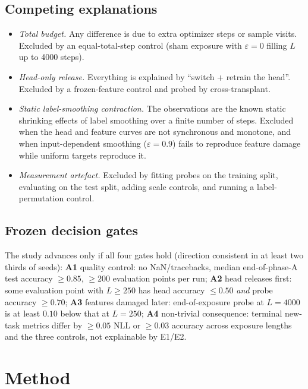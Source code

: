\documentclass[review,12pt]{elsarticle}
\begin{document}
\subsection{Competing explanations}
\label{sec:competing}
\begin{itemize}
  \item[\textbf{E1}] \emph{Total budget.} Any difference is due to extra
  optimizer steps or sample visits. Excluded by an equal-total-step control
  (sham exposure with $\varepsilon=0$ filling $L$ up to 4000 steps).
  \item[\textbf{E2}] \emph{Head-only release.} Everything is explained by
  ``switch + retrain the head''. Excluded by a frozen-feature control and
  probed by cross-transplant.
  \item[\textbf{E3}] \emph{Static label-smoothing contraction.} The
  observations are the known static shrinking effects of label smoothing
  \cite{guo2025cross,wang2025maxsup} over a finite number of steps. Excluded
  when the head and feature curves are not synchronous and monotone, and when
  input-dependent smoothing ($\varepsilon=0.9$) fails to reproduce feature
  damage while uniform targets reproduce it.
  \item[\textbf{E4}] \emph{Measurement artefact.} Excluded by fitting probes
  on the training split, evaluating on the test split, adding scale controls,
  and running a label-permutation control.
\end{itemize}

\subsection{Frozen decision gates}
\label{sec:gates}
The study advances only if all four gates hold (direction consistent in at
least two thirds of seeds):
\textbf{A1} quality control: no NaN/tracebacks, median end-of-phase-A test
accuracy $\ge 0.85$, $\ge 200$ evaluation points per run;
\textbf{A2} head releases first: some evaluation point with $L\ge250$ has
head accuracy $\le0.50$ \emph{and} probe accuracy $\ge0.70$;
\textbf{A3} features damaged later: end-of-exposure probe at $L{=}4000$ is at
least $0.10$ below that at $L{=}250$;
\textbf{A4} non-trivial consequence: terminal new-task metrics differ by
$\ge0.05$ NLL or $\ge0.03$ accuracy across exposure lengths and the three
controls, not explainable by E1/E2.

\section{Method}
\label{sec:method}
\end{document}

